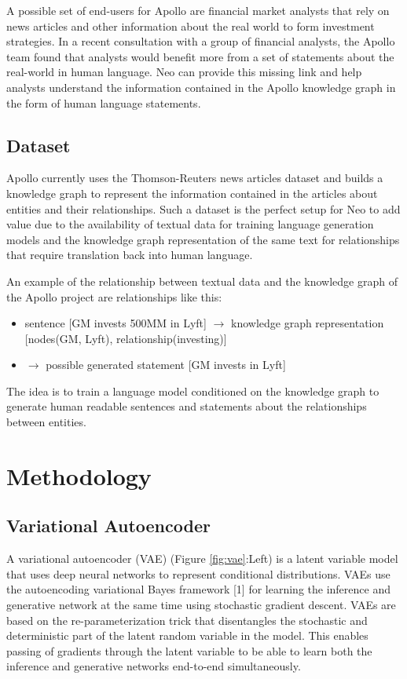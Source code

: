 \documentclass[a4paper]{article}
\begin{document}
A possible set of end-users for Apollo are financial market analysts that rely on news articles and other information about the real world to form investment strategies. In a recent consultation with a group of financial analysts, the Apollo team found that analysts would benefit more from a set of statements about the real-world in human language. Neo can provide this missing link and help analysts understand the information contained in the Apollo knowledge graph in the form of human language statements.

\subsection{Dataset}
Apollo currently uses the Thomson-Reuters news articles dataset and builds a knowledge graph to represent the information contained in the articles about entities and their relationships. Such a dataset is the perfect setup for Neo to add value due to the availability of textual data for training language generation models and the knowledge graph representation of the same text for relationships that require translation back into human language.

An example of the relationship between textual data and the knowledge graph of the Apollo project are relationships like this:
\begin{itemize}
  \item sentence [GM invests 500MM in Lyft] $\to$ knowledge graph representation [nodes(GM, Lyft), relationship(investing)]
  \item $\to$ possible generated statement [GM invests in Lyft]
\end{itemize}
 
The idea is to train a language model conditioned on the knowledge graph to generate human readable sentences and statements about the relationships between entities.

\section{Methodology}
\subsection{Variational Autoencoder}
A variational autoencoder (VAE) (Figure \ref{fig:vae}:Left) is a latent variable model that uses deep neural networks to represent conditional distributions. VAEs use the autoencoding variational Bayes framework [1] for learning the inference and generative network at the same time using stochastic gradient descent. VAEs are based on the re-parameterization trick that disentangles the stochastic and deterministic part of the latent random variable in the model. This enables passing of gradients through the latent variable to be able to learn both the inference and generative networks end-to-end simultaneously. 
\end{document}
